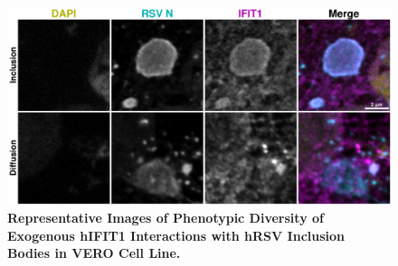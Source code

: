 \begin{figure}
    \centering
    \includegraphics[width=1\linewidth]{09. Chapter 4/Figs/04. Overexpression/01. IFIT1/03. i1-hrsv.pdf}
    \caption[Representative Images of Phenotypic Diversity of Exogenous hIFIT1 Interactions with hRSV Inclusion Bodies in VERO Cell Line.]{\textbf{Representative Images of Phenotypic Diversity of Exogenous hIFIT1 Interactions with hRSV Inclusion Bodies in VERO Cell Line.} }
    \label{fig:Representative Images of Phenotypic Diversity of Exogenous hIFIT1 Interactions with hRSV Inclusion Bodies in VERO Cell Line}
\end{figure}


